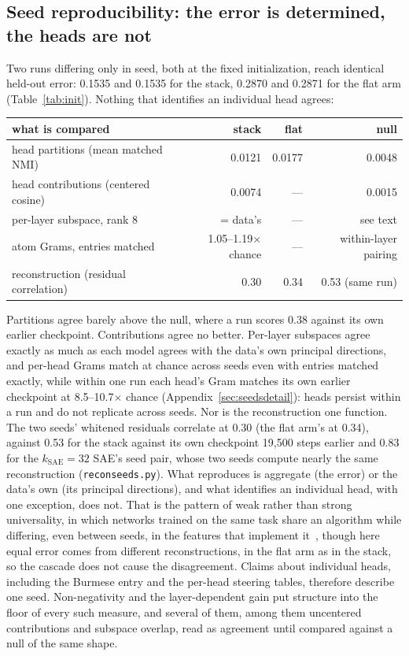 \subsection{Seed reproducibility: the error is determined, the heads are not}
\label{sec:seeds}

Two runs differing only in seed, both at the fixed initialization, reach
identical held-out error: 0.1535 and 0.1535 for the stack, 0.2870 and
0.2871 for the flat arm (Table~\ref{tab:init}). Nothing that identifies an
individual head agrees:

\begin{center}\small\setlength{\tabcolsep}{4pt}
\begin{tabular}{@{}lrrr@{}}
\toprule
what is compared & stack & flat & null \\
\midrule
head partitions (mean matched NMI) & 0.0121 & 0.0177 & 0.0048 \\
head contributions (centered cosine) & 0.0074 & --- & 0.0015 \\
per-layer subspace, rank 8 & = data's & --- & see text \\
atom Grams, entries matched & 1.05--1.19$\times$ chance & --- & within-layer pairing \\
reconstruction (residual correlation) & 0.30 & 0.34 & 0.53 (same run) \\
\bottomrule
\end{tabular}
\end{center}

Partitions agree barely above the null, where a run scores 0.38 against
its own earlier checkpoint. Contributions agree no better. Per-layer
subspaces agree exactly as much as each model agrees with the data's own
principal directions, and per-head Grams match at chance across seeds
even with entries matched exactly, while within one run each head's Gram
matches its own earlier checkpoint at 8.5--10.7$\times$ chance
(Appendix~\ref{sec:seedsdetail}): heads persist within a run and do not
replicate across seeds. Nor is the reconstruction one function. The two
seeds' whitened residuals correlate at 0.30 (the flat arm's at 0.34),
against 0.53 for the stack against its own checkpoint 19{,}500 steps
earlier and 0.83 for the $k_{\mathrm{SAE}}{=}32$ SAE's seed pair, whose
two seeds compute nearly the same reconstruction
(\texttt{reconseeds.py}). What reproduces is aggregate (the error) or the
data's own (its principal directions), and what identifies an individual
head, with one exception, does not. That is the pattern of weak rather
than strong universality, in which networks trained on the same task
share an algorithm while differing, even between seeds, in the features
that implement it~\cite{chughtai2023}, though here equal error comes from
different reconstructions, in the flat arm as in the stack, so the
cascade does not cause the disagreement. Claims about individual heads,
including the Burmese entry and the per-head steering tables, therefore
describe one seed. Non-negativity and the layer-dependent gain put
structure into the floor of every such measure, and several of them,
among them uncentered contributions and subspace overlap, read as
agreement until compared against a null of the same shape.


